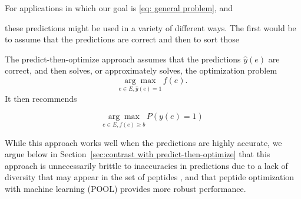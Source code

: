 \documentclass[11pt]{article}
\newcommand{\pfcomment}[1]{{\color{blue} PF: #1}}
\begin{document}
For applications in which our goal is \eqref{eq: general problem}, and 

these predictions might be used in a variety of different ways.  The first would be to assume that the predictions are correct and then to sort those 




The predict-then-optimize approach assumes that the predictions $\hat{y}(e)$ are correct, and then solves, or approximately solves, the optimization problem 
\begin{equation*}
  \underset{e \in E, \hat{y}(e) = 1}{\arg\max} \, f(e).
  \label{}
\end{equation*}
It then recommends 


\begin{equation*}
  \underset{e \in E, f(e) \ge b}{\arg\max} \, P(y(e)=1)
  \label{}
\end{equation*}


While this approach works well when the predictions are highly accurate, we argue below in Section~\ref{sec:contrast with predict-then-optimize} that this approach is unnecessarily brittle to inaccuracies in predictions due to a lack of diversity that may appear in the set of peptides , and that peptide optimization with machine learning (POOL) provides more robust performance.
\end{document}

